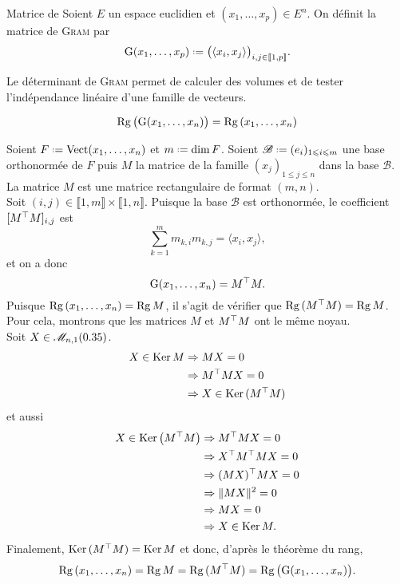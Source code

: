 \begin{defi}{Matrice de }
    Soient $E$ un espace euclidien et $(x_1, \dots, x_p) \in E^n$. On définit la matrice de \textsc{Gram} par
    $$\Gram(x_1, \dots, x_p) \defeq \big( \langle x_i, x_j \rangle \big)_{i,j \in \llbracket 1, p \rrbracket}.$$
\end{defi}
Le déterminant de \textsc{Gram} permet de calculer des volumes et de tester l'indépendance linéaire d'une famille de vecteurs.
\begin{prop}{}
    $$\mathrm{Rg}\, \big( \mathrm{G}(x_1, \dots, x_n) \big) = \mathrm{Rg}\,(x_1, \dots, x_n)$$
\end{prop}

\begin{preuve}
    Soient $F \defeq \Vect(x_1, \dots, x_n)$ et $m \defeq \dim F$. Soient $\mathscr{B} \defeq (e_i)_{1 \leqslant i \leqslant m}$ une base orthonormée de $F$ puis $M$ la matrice de la famille $(x_j)_{1 \leqslant j \leqslant n}$ dans la base $\mathscr{B}$. La matrice $M$ est une matrice rectangulaire de format $(m, n)$. \\
    Soit $(i, j) \in \llbracket 1, m \rrbracket \times \llbracket 1, n \rrbracket$. Puisque la base $\mathscr{B}$ est orthonormée, le coefficient $[ M^\top M ]_{i,j}$ est 
    $$\sum_{k=1}^m m_{k,i} m_{k,j} = \langle x_i, x_j \rangle,$$
    et on a donc
    $$\mathrm{G}(x_1, \dots, x_n) = M^\top M.$$
    Puisque $\mathrm{Rg}\,(x_1, \dots, x_n) = \mathrm{Rg}\, M$, il s'agit de vérifier que $\mathrm{Rg}\,(M^\top M) = \mathrm{Rg}\, M$. Pour cela, montrons que les matrices $M$ et $M^\top M$ ont le même noyau. \\
    Soit $X \in \mathscr{M}_{n,1}(0.35)$.
    \begin{align*}
        X \in \mathrm{Ker}\, M &\Rightarrow MX = 0 \\
        &\Rightarrow M^\top MX = 0 \\
        &\Rightarrow X \in \mathrm{Ker}\,(M^\top M)
    \end{align*}
    et aussi
    \begin{align*}
        X \in \mathrm{Ker}\, \big( M^\top M \big) &\Rightarrow M^\top MX = 0 \\
        &\Rightarrow X^\top M^\top MX = 0 \\
        &\Rightarrow (MX)^\top MX = 0 \\
        &\Rightarrow \Vert MX \Vert^2 = 0 \\
        &\Rightarrow MX = 0 \\
        &\Rightarrow X \in \mathrm{Ker}\, M.
    \end{align*}
    Finalement, $\mathrm{Ker}\,(M^\top M) = \mathrm{Ker}\, M$ et donc, d'après le théorème du rang,
    $$\mathrm{Rg}\,(x_1, \dots, x_n) = \mathrm{Rg}\, M = \mathrm{Rg}\,(M^\top M) = \mathrm{Rg}\, \big( \mathrm{G}(x_1, \dots, x_n) \big).$$
\end{preuve}

